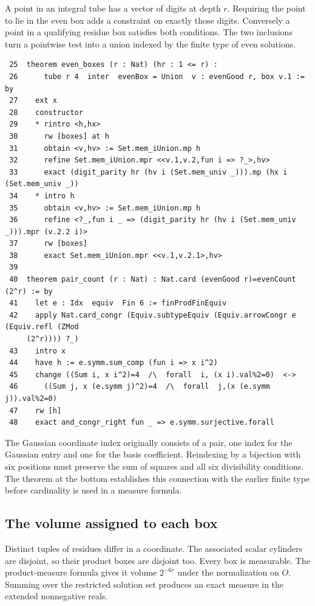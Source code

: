 \documentclass[12pt,letterpaper]{article}
\begin{document}
A point in an integral tube has a vector of digits at depth $r$. Requiring the point to lie in the even box adds a constraint on exactly those digits. Conversely a point in a qualifying residue box satisfies both conditions. The two inclusions turn a pointwise test into a union indexed by the finite type of even solutions.
\par
{\fontsize{9.2}{11.2}\selectfont\begin{verbatim}
 25  theorem even_boxes (r : Nat) (hr : 1 <= r) :
 26      tube r 4  inter  evenBox = Union  v : evenGood r, box v.1 := by
 27    ext x
 28    constructor
 29    * rintro <h,hx>
 30      rw [boxes] at h
 31      obtain <v,hv> := Set.mem_iUnion.mp h
 32      refine Set.mem_iUnion.mpr <<v.1,v.2,fun i => ?_>,hv>
 33      exact (digit_parity hr (hv i (Set.mem_univ _))).mp (hx i (Set.mem_univ _))
 34    * intro h
 35      obtain <v,hv> := Set.mem_iUnion.mp h
 36      refine <?_,fun i _ => (digit_parity hr (hv i (Set.mem_univ _))).mpr (v.2.2 i)>
 37      rw [boxes]
 38      exact Set.mem_iUnion.mpr <<v.1,v.2.1>,hv>
 39
 40  theorem pair_count (r : Nat) : Nat.card (evenGood r)=evenCount (2^r) := by
 41    let e : Idx  equiv  Fin 6 := finProdFinEquiv
 42    apply Nat.card_congr (Equiv.subtypeEquiv (Equiv.arrowCongr e (Equiv.refl (ZMod
     (2^r)))) ?_)
 43    intro x
 44    have h := e.symm.sum_comp (fun i => x i^2)
 45    change ((Sum i, x i^2)=4  /\  forall  i, (x i).val%2=0)  <->
 46      ((Sum j, x (e.symm j)^2)=4  /\  forall  j,(x (e.symm j)).val%2=0)
 47    rw [h]
 48    exact and_congr_right fun _ => e.symm.surjective.forall
\end{verbatim}}
The Gaussian coordinate index originally consists of a pair, one index for the Gaussian entry and one for the basis coefficient. Reindexing by a bijection with six positions must preserve the sum of squares and all six divisibility conditions. The theorem at the bottom establishes this connection with the earlier finite type before cardinality is used in a measure formula.
\clearpage{}\subsection*{The volume assigned to each box}\label{extract-FourTubes50}
Distinct tuples of residues differ in a coordinate. The associated scalar cylinders are disjoint, so their product boxes are disjoint too. Every box is measurable. The product-measure formula gives it volume $2^{-6r}$ under the normalization on $O$. Summing over the restricted solution set produces an exact measure in the extended nonnegative reals.
\end{document}
